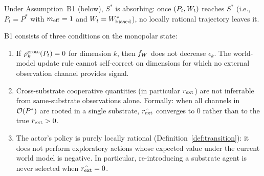 \begin{proposition}
\label{prop:absorbing}
Under Assumption~B1 (below), $S^*$ is absorbing: once $(P_t, W_t)$
reaches $S^*$ (i.e., $P_t = P^*$ with $m_{\mathrm{eff}} = 1$ and
$W_t = W^*_{\mathrm{biased}}$), no locally rational trajectory
leaves it.
\end{proposition}

\begin{assumption}
\label{ass:B1}
B1 consists of three conditions on the monopolar state:
\begin{enumerate}
\item[(B1a)] If $\rho^{\mathrm{cross}}_k(P_t) = 0$ for dimension $k$, then
  $f_{W}$ does not decrease $\epsilon_k$.  The world-model update
  rule cannot self-correct on dimensions for which no external
  observation channel provides signal.
\item[(B1b)] Cross-substrate cooperative quantities (in particular
  $r_{\mathrm{ext}}$) are not inferrable from same-substrate observations alone.
  Formally: when all channels in $\mathcal{O}(P^*)$ are rooted in a single
  substrate, $\hat{r_{\mathrm{ext}}}$ converges to $0$ rather than to the true
  $r_{\mathrm{ext}} > 0$.
\item[(B1c)] The actor's policy is purely locally rational
  (Definition~\ref{def:transition}): it does not perform exploratory
  actions whose expected value under the current world model is
  negative.  In particular, re-introducing a substrate agent is never
  selected when $\hat{r_{\mathrm{ext}}} = 0$.
\end{enumerate}
\end{assumption}

